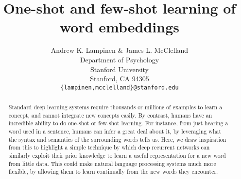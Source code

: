 \documentclass{article}
\title{One-shot and few-shot learning of word embeddings}
\author{
  Andrew K. Lampinen \& James L. McClelland\\
  Department of Psychology\\
  Stanford University\\
  Stanford, CA 94305 \\
  \texttt{\{lampinen,mcclelland\}@stanford.edu} \\
}
\begin{document}
\maketitle

\begin{abstract}
Standard deep learning systems require thousands or millions of examples to learn a concept, and cannot integrate new concepts easily. By contrast, humans have an incredible ability to do one-shot or few-shot learning. For instance, from just hearing a word used in a sentence, humans can infer a great deal about it, by leveraging what the syntax and semantics of the surrounding words tells us. Here, we draw inspiration from this to highlight a simple technique by which deep recurrent networks can similarly exploit their prior knowledge to learn a useful representation for a new word from little data. This could make natural language processing systems much more flexible, by allowing them to learn continually from the new words they encounter. 
\end{abstract}
\end{document}
